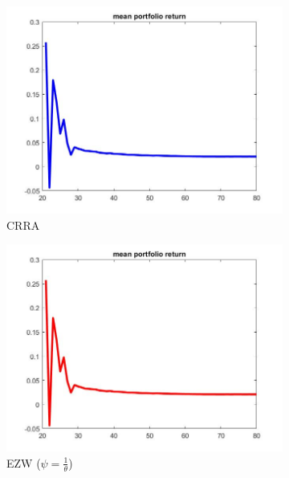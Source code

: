 \documentclass[12pt,a4paper]{article}
\begin{document}
\begin{figure}[h!]
  \centering
  \begin{subfigure}[b]{0.32\linewidth}
    \includegraphics[width=\linewidth]{graphs/Q2/mean_ret.jpg}
    \caption{CRRA}
  \end{subfigure}
  \begin{subfigure}[b]{0.32\linewidth}
      \includegraphics[width=\linewidth]{graphs/Q4/mean_ret_ezw--.jpg}
      \caption{EZW ($\psi = \frac{1}{\theta}$)}
  \end{subfigure}
  \begin{subfigure}[b]{0.32\linewidth}

\end{subfigure}
\end{figure}
\end{document}
